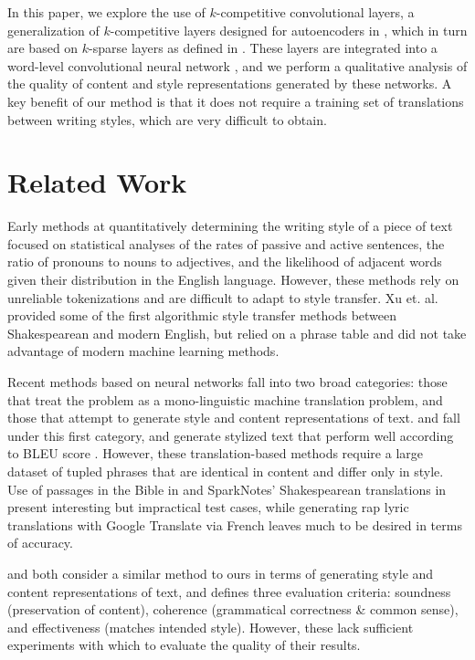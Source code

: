 \documentclass{vldb}
\begin{document}
In this paper, we explore the use of $k$-competitive convolutional layers, a generalization of $k$-competitive layers designed for autoencoders in \cite{KATE}, which in turn are based on $k$-sparse layers as defined in \cite{MakhzaniF13}. These layers are integrated into a word-level convolutional neural network \cite{Kim14f}, and we perform a qualitative analysis of the quality of content and style representations generated by these networks. A key benefit of our method is that it does not require a training set of translations between writing styles, which are very difficult to obtain.

\section{Related Work}
Early methods at quantitatively determining the writing style of a piece of text focused on statistical analyses of the rates of passive and active sentences, the ratio of pronouns to nouns to adjectives, and the likelihood of adjacent words given their distribution in the English language. However, these methods rely on unreliable tokenizations and are difficult to adapt to style transfer. Xu et. al. \cite{Xu12} provided some of the first algorithmic style transfer methods between Shakespearean and modern English, but relied on a phrase table and did not take advantage of modern machine learning methods. 

Recent methods based on neural networks fall into two broad categories: those that treat the problem as a mono-linguistic machine translation problem, and those that attempt to generate style and content representations of text.  \cite{Carlson17} and \cite{Jang16} fall under this first category, and generate stylized text that perform well according to BLEU score \cite{Papineni02}. However, these translation-based methods require a large dataset of tupled phrases that are identical in content and differ only in style. Use of passages in the Bible in \cite{Carlson17} and SparkNotes' Shakespearean translations in \cite{Jang16} present interesting but impractical test cases, while generating rap lyric translations with Google Translate via French \cite{Jang16} leaves much to be desired in terms of accuracy. 

\cite{Edirisooriya} and \cite{Kabbara16} both consider a similar method to ours in terms of generating style and content representations of text, and \cite{Kabbara16} defines three evaluation criteria: soundness (preservation of content), coherence (grammatical correctness \& common sense), and effectiveness (matches intended style). However, these lack sufficient experiments with which to evaluate the quality of their results. 
\end{document}
